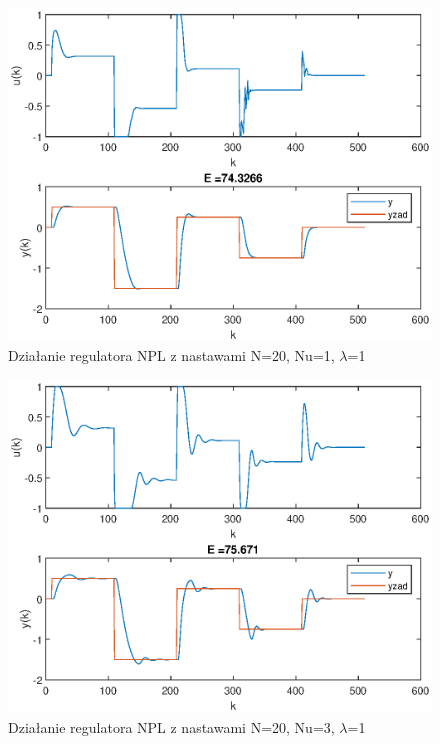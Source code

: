 		\begin{figure}[h!]
			\centering
			\includegraphics[width=\linewidth]{img/NPLNu1.eps}
			\caption{Działanie regulatora NPL z nastawami N=20, Nu=1, $\lambda$=1}
			\label{fig:NPL2}
		\end{figure}
		
		\begin{figure}[h!]
			\centering
			\includegraphics[width=\linewidth]{img/NPLNu3.eps}
			\caption{Działanie regulatora NPL z nastawami N=20, Nu=3, $\lambda$=1}
			\label{fig:NPL3}
		\end{figure}
		

